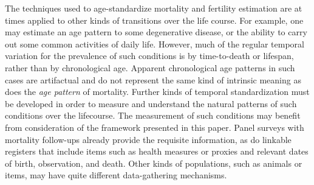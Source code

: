 \documentclass[12pt,oneside,a4paper]{article} %
\theoremstyle{definition}
\begin{document}

The techniques used to age-standardize mortality and fertility estimation are at
times applied to other kinds of transitions over the life course. For example,
one may estimate an age pattern to some degenerative disease, or the
ability to carry out some common activities of daily life. However, much of the
regular temporal variation for the prevalence of such conditions is by
time-to-death or lifespan, rather than by chronological age. Apparent chronological age patterns
in such cases are artifactual and do not represent the same kind of
intrinsic meaning as does the \textit{age pattern} of mortality. Further kinds
of temporal standardization must be developed in order to measure and understand
the natural patterns of such conditions over the lifecourse. 
The measurement of
such conditions may benefit from consideration of the framework presented in
this paper. %
Panel surveys with mortality follow-ups already provide the requisite
information, as do linkable registers that include items such as
health measures or proxies and relevant dates of birth, observation, and death.
Other kinds of populations, such as animals or items, may have quite different
data-gathering mechanisms.

\end{document}
